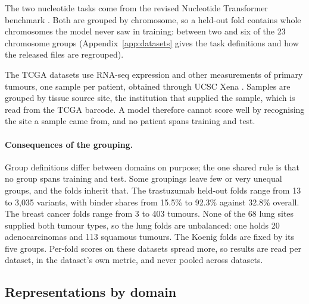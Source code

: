 The two nucleotide tasks come from the revised Nucleotide Transformer benchmark \citep{DallaTorre2025}. Both are grouped by chromosome, so a held-out fold contains whole chromosomes the model never saw in training: between two and six of the 23 chromosome groups (Appendix~\ref{app:datasets} gives the task definitions and how the released files are regrouped).

The TCGA datasets use RNA-seq expression and other measurements of primary tumours, one sample per patient, obtained through UCSC Xena \citep{Goldman2020}. Samples are grouped by tissue source site, the institution that supplied the sample, which is read from the TCGA barcode. A model therefore cannot score well by recognising the site a sample came from, and no patient spans training and test.

\paragraph{Consequences of the grouping.} Group definitions differ between domains on purpose; the one shared rule is that no group spans training and test. Some groupings leave few or very unequal groups, and the folds inherit that. The trastuzumab held-out folds range from 13 to 3,035 variants, with binder shares from 15.5\% to 92.3\% against 32.8\% overall. The breast cancer folds range from 3 to 403 tumours. None of the 68 lung sites supplied both tumour types, so the lung folds are unbalanced: one holds 20 adenocarcinomas and 113 squamous tumours. The Koenig folds are fixed by its five groups. Per-fold scores on these datasets spread more, so results are read per dataset, in the dataset's own metric, and never pooled across datasets.
\subsection{Representations by domain}

